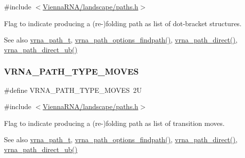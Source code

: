 {\ttfamily \#include $<$\mbox{\hyperlink{paths_8h}{Vienna\+R\+N\+A/landscape/paths.\+h}}$>$}



Flag to indicate producing a (re-\/)folding path as list of dot-\/bracket structures. 

\begin{DoxySeeAlso}{See also}
\mbox{\hyperlink{group__paths_ga818d4f3d1cf8723d6905990b08d909fe}{vrna\+\_\+path\+\_\+t}}, \mbox{\hyperlink{group__paths__direct_ga3790a24ca64d68acfa6e67b525151a5f}{vrna\+\_\+path\+\_\+options\+\_\+findpath()}}, \mbox{\hyperlink{group__paths__direct_gacba096caf9a6fe134f33a5afcf2248d8}{vrna\+\_\+path\+\_\+direct()}}, \mbox{\hyperlink{group__paths__direct_ga51d9edaeb42d1d178ea8ba46ccd4c8c0}{vrna\+\_\+path\+\_\+direct\+\_\+ub()}} 
\end{DoxySeeAlso}
\mbox{\label{group__paths_gaa73703da105dc6c98957fb8247c93f1f}} 
\subsubsection{\texorpdfstring{VRNA\_PATH\_TYPE\_MOVES}{VRNA\_PATH\_TYPE\_MOVES}}
{\footnotesize\ttfamily \#define V\+R\+N\+A\+\_\+\+P\+A\+T\+H\+\_\+\+T\+Y\+P\+E\+\_\+\+M\+O\+V\+ES~2U}



{\ttfamily \#include $<$\mbox{\hyperlink{paths_8h}{Vienna\+R\+N\+A/landscape/paths.\+h}}$>$}



Flag to indicate producing a (re-\/)folding path as list of transition moves. 

\begin{DoxySeeAlso}{See also}
\mbox{\hyperlink{group__paths_ga818d4f3d1cf8723d6905990b08d909fe}{vrna\+\_\+path\+\_\+t}}, \mbox{\hyperlink{group__paths__direct_ga3790a24ca64d68acfa6e67b525151a5f}{vrna\+\_\+path\+\_\+options\+\_\+findpath()}}, \mbox{\hyperlink{group__paths__direct_gacba096caf9a6fe134f33a5afcf2248d8}{vrna\+\_\+path\+\_\+direct()}}, \mbox{\hyperlink{group__paths__direct_ga51d9edaeb42d1d178ea8ba46ccd4c8c0}{vrna\+\_\+path\+\_\+direct\+\_\+ub()}} 
\end{DoxySeeAlso}


